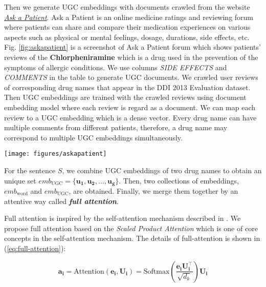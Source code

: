 \documentclass[conference]{IEEEtran}
\begin{document}
Then we generate UGC embeddings with documents crawled from the website
\href{www.askapatient.com}{\emph{Ask a Patient}}.
Ask a Patient is an online medicine ratings and reviewing forum where patients can
share and compare their medication experiences on various aspects
such as physical or mental feelings, dosage, durations, side effects, etc.
Fig. \ref{fig:askapatient} is a screenshot of Ask a Patient forum which shows patients' reviews of the
\textbf{Chlorpheniramine} which is a drug used in the prevention of the symptoms of allergic conditions.
We use columns \emph{SIDE EFFECTS} and \emph{COMMENTS} in the table to generate UGC documents.
We crawled user reviews of corresponding drug names that appear in the DDI 2013 Evaluation dataset.
Then UGC embeddings are trained with the crawled reviews using document embedding model 
\cite{le_distributed_2014} where each review is regard as a document.
We can map each review to a UGC embedding which is a dense vector.
Every drug name can have multiple comments from different patients,
therefore, a drug name may correspond to multiple UGC embeddings simultaneously.

\begin{figure*}[ht]
	\centering
	\texttt{[image: figures/askapatient]}
	\caption{Patients' reviews on \textbf{Chlorpheniramine} from Ask a Patient.}
	\label{fig:askapatient}
\end{figure*}

For the sentence $S$, we combine UGC embeddings of two drug names to obtain an unique set $emb_{\text{UGC}} = \{ \bm{u_1}, \bm{u_2}, \dots, \bm{u_g}\}$.
Then, two collections of embeddings, $emb_{\text{word}}$ and $emb_{\text{UGC}}$, are obtained.
Finally, we merge them together by an attentive way called \textbf{\emph{full attention}}.

Full attention is inspired by the self-attention mechanism described in \cite{vaswani_attention_2017}.
We propose full attention based on the \emph{Scaled Product Attention} which is one of core concepts in the self-attention mechanism.
The details of full-attention is shown in (\ref{eq:full-attention}):

\begin{equation}
\label{eq:full-attention}
\bm{a_i} = \text{Attention}(\bm{e_i}, \bm{U_i}) = \text{Softmax}\left ( \frac{\bm{e_i} \bm{U_i^{\top}}}{\sqrt{d_k}} \right ) \bm{U_i}
\end{equation}
\end{document}
